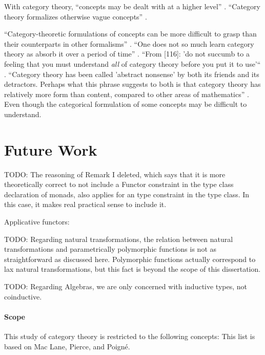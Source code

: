 With category theory, ``concepts may be dealt with at a higher level''
\parencite[xi]{pierce-1991}. ``Category theory formalizes otherwise
vague concepts'' \parencite[414]{poigne-1992}.

``Category-theoretic formulations of concepts can be more difficult to
grasp than their counterparts in other formalisms''
\parencite[xi]{pierce-1991}. ``One does not so much learn category
theory as absorb it over a period of time''
\parencite[25]{bird-demoor-1997}. ``From [116]: 'do not succumb to a
feeling that you must understand \emph{all} of category theory before
you put it to use'`` \parencite[xi]{pierce-1991}. ``Category theory
has been called 'abstract nonsense' by both its friends and its
detractors. Perhaps what this phrase suggests to both is that category
theory has relatively more form than content, compared to other areas
of mathematics'' \parencite[50]{goguen-1991}. Even though the
categorical formulation of some concepts may be difficult to
understand.

\section{Future Work}

TODO: The reasoning of Remark I deleted, which says that it is more
theoretically correct to not include a Functor constraint in the type
class declaration of monads, also applies for an
 type constraint in the 
type class. In this case, it makes real practical sense to include
it.

Applicative functors: \parencite{mcbride-paterson-2008}

TODO: Regarding natural transformations, the relation between natural
transformations and parametrically polymorphic functions is not as
straightforward as discussed here. Polymorphic functions actually
correspond to lax natural transformations, but this fact is beyond the
scope of this dissertation.

TODO: Regarding Algebras, we are only concerned with inductive types,
not coinductive.

\paragraph{Scope}

This study of category theory is restricted to the following concepts:
This list is based on Mac Lane, Pierce, and Poigné.

